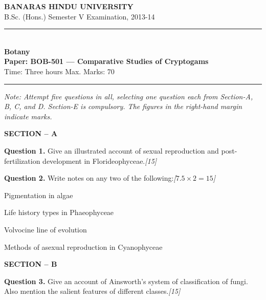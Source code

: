 \documentclass[11pt,a4paper]{article}
\newcommand{\pts}[1]{\hfill   \textit{[#1]}}
\begin{document}
\begin{center}
  {\large\bfseries BANARAS HINDU UNIVERSITY}\\[2pt]
  {\normalsize B.Sc. (Hons.) Semester V Examination, 2013-14}\\[6pt]
  \rule{0.8\linewidth}{0.5pt}\\[6pt]
  {\large\bfseries Botany}\\[4pt]
  {\large\bfseries Paper: BOB-501 --- Comparative Studies of Cryptogams}\\[4pt]
  {\normalsize Time: Three hours \hfill Max. Marks: 70}
\end{center}

\rule{\linewidth}{0.4pt}

\smallskip



\noindent   \textit{Note: Attempt five questions in all, selecting one question each from Section-A, B, C, and D. Section-E is compulsory. The figures in the right-hand margin indicate marks.}

\bigskip

\begin{center}
   \textbf{SECTION -- A}
\end{center}

\medskip


\noindent   \textbf{Question 1.} Give an illustrated account of sexual reproduction and post-fertilization development in Florideophyceae.\pts{15}

\medskip


\noindent   \textbf{Question 2.} Write notes on any two of the following:\pts{$7.5  \times 2 = 15$}

\begin{parts}
  \item Pigmentation in algae
  \item Life history types in Phaeophyceae
  \item Volvocine line of evolution
  \item Methods of asexual reproduction in Cyanophyceae
\end{parts}

\bigskip

\begin{center}
   \textbf{SECTION -- B}
\end{center}

\medskip


\noindent   \textbf{Question 3.} Give an account of Ainsworth's system of classification of fungi. Also mention the salient features of different classes.\pts{15}
\end{document}
